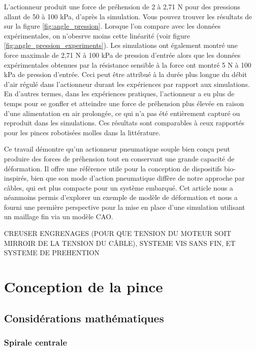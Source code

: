 \documentclass[a4paper, 11pt]{report}
\begin{document}
            L'actionneur produit une force de préhension de 2 à 2,71 N pour des pressions allant de 50 à 100 kPa, d'après la simulation. Vous pouvez trouver les résultats de sur la figure \ref{fig:angle_pression}. Lorsque l'on compare avec les données expérimentales, on n'obesrve moins cette linéarité (voir figure \ref{fig:angle_pression_experiments}). Les simulations ont également montré une force maximale de 2,71 N à 100 kPa de pression d'entrée alors que les données expérimentales obtenues par la résistance sensible à la force ont montré 5 N à 100 kPa de pression d'entrée. Ceci peut être attribué à la durée plus longue du débit d'air régulé dans l'actionneur durant les expériences par rapport aux simulations. En d'autres termes, dans les expériences pratiques, l'actionneur a eu plus de temps pour se gonfler et atteindre une force de préhension plus élevée en raison d'une alimentation en air prolongée, ce qui n'a pas été entièrement capturé ou reproduit dans les simulations. Ces résultats sont comparables à ceux rapportés pour les pinces robotisées molles dans la littérature. \cite{bhat_numerical_2025}

            Ce travail démontre qu'un actionneur pneumatique souple bien conçu peut produire des forces de préhension tout en conservant une grande capacité de déformation. Il offre une référence utile pour la conception de dispositifs bio-inspirés, bien que son mode d'action pneumatique diffère de notre approche par câbles, qui est plus compacte pour un système embarqué. Cet article nous a néanmoins permis d'explorer un exemple de modèle de déformation et nous a fourni une première perspective pour la mise en place d'une simulation utilisant un maillage fin via un modèle CAO.

            CREUSER ENGRENAGES (POUR QUE TENSION DU MOTEUR SOIT MIRROIR DE LA TENSION DU CÂBLE), SYSTEME VIS SANS FIN, ET SYSTEME DE PREHENTION



\clearpage
        
\section{Conception de la pince}
        
    \subsection{Considérations mathématiques}

        \subsubsection{Spirale centrale}
            
\end{document}
